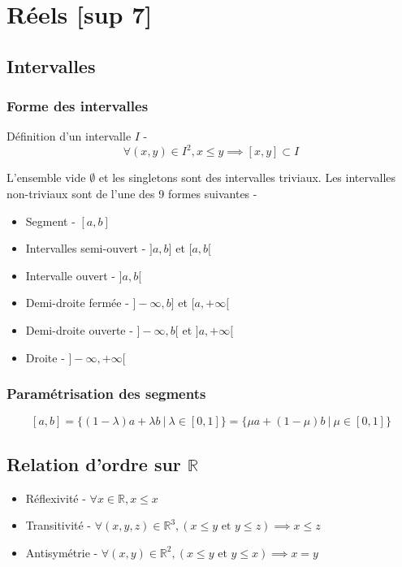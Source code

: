 \documentclass[openany]{book}
\begin{document}
\clearpage
\section{Réels [sup 7]}

\subsection{Intervalles}
\subsubsection{Forme des intervalles}
Définition d'un intervalle $I$ - 
\[ \forall(x, y) \in I^2, x\leq y \implies [x, y] \subset I \]

\noindent L'ensemble vide $ \emptyset $ et les singletons sont des intervalles triviaux. Les intervalles non-triviaux sont de l'une des 9 formes suivantes -
\begin{itemize}
    \item Segment - $[a, b]$
    \item Intervalles semi-ouvert - $]a,b]$ et $[a,b[$
    \item Intervalle ouvert - $]a,b[$
    \item Demi-droite fermée - $]-\infty, b]$ et $[a, +\infty[$
    \item Demi-droite ouverte - $]-\infty, b[$ et $]a, +\infty[$
    \item Droite - $]-\infty,+\infty[$
\end{itemize}

\subsubsection{Paramétrisation des segments}
\[ [a, b] = \{(1-\lambda)a + \lambda b \ | \ \lambda \in [0,1]\} = \{\mu a + (1-\mu) b \ | \ \mu \in [0,1]\} \]

\subsection{Relation d'ordre sur $\mathbb{R}$}
\begin{itemize}
    \item Réflexivité - $\forall x \in \mathbb{R}, x \leq x$
    \item Transitivité - $\forall (x,y,z) \in \mathbb{R}^3, (x \leq y \text{ et } y \leq z) \implies x \leq z $
    \item Antisymétrie - $\forall (x,y) \in \mathbb{R}^2, (x \leq y \text{ et } y \leq x) \implies x = y$
\end{itemize}
\end{document}

